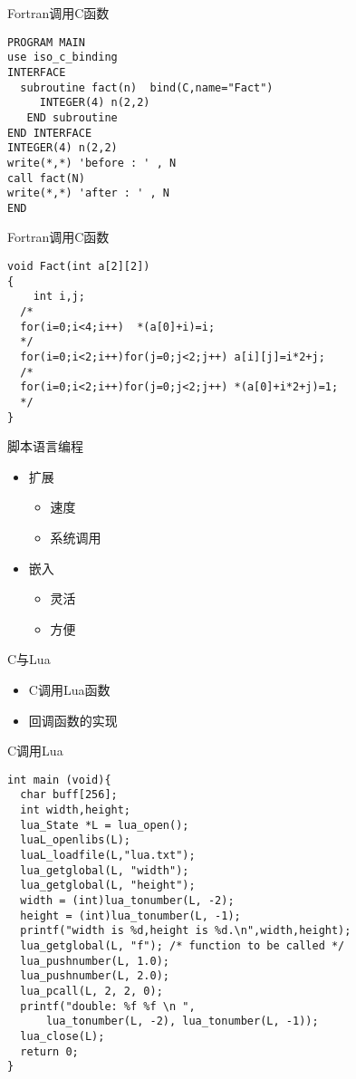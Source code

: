 \def\lstlistingname{例}
\begin{frame}[containsverbatim]{Fortran调用C函数}
\lstset{language=fortran}
\begin{lstlisting}
PROGRAM MAIN
use iso_c_binding
INTERFACE
  subroutine fact(n)  bind(C,name="Fact")
     INTEGER(4) n(2,2)
   END subroutine
END INTERFACE
INTEGER(4) n(2,2)
write(*,*) 'before : ' , N 
call fact(N)
write(*,*) 'after : ' , N 
END
\end{lstlisting}
\end{frame}

\begin{frame}[containsverbatim]{Fortran调用C函数}
\lstset{language=C}
\begin{lstlisting}
void Fact(int a[2][2])
{
 	int i,j;
  /*
  for(i=0;i<4;i++)  *(a[0]+i)=i;
  */
  for(i=0;i<2;i++)for(j=0;j<2;j++) a[i][j]=i*2+j;
  /*
  for(i=0;i<2;i++)for(j=0;j<2;j++) *(a[0]+i*2+j)=1;
  */
}
\end{lstlisting}
\end{frame}


\begin{frame}{脚本语言编程}
\begin{itemize}
\item 扩展
\begin{itemize}
\item 速度
\item 系统调用
\end{itemize}
\item 嵌入
\begin{itemize}
\item 灵活
\item 方便
\end{itemize}
\end{itemize}
\end{frame}

\begin{frame}{C与Lua}
\begin{itemize}
\item C调用Lua函数
\item 回调函数的实现
\end{itemize}
\end{frame}



\begin{frame}[containsverbatim]{C调用Lua}
\begin{lstlisting}
int main (void){
  char buff[256];
  int width,height;
  lua_State *L = lua_open();
  luaL_openlibs(L);
  luaL_loadfile(L,"lua.txt");
  lua_getglobal(L, "width");
  lua_getglobal(L, "height");
  width = (int)lua_tonumber(L, -2);
  height = (int)lua_tonumber(L, -1);
  printf("width is %d,height is %d.\n",width,height);
  lua_getglobal(L, "f"); /* function to be called */
  lua_pushnumber(L, 1.0);
  lua_pushnumber(L, 2.0);
  lua_pcall(L, 2, 2, 0);
  printf("double: %f %f \n ", 
      lua_tonumber(L, -2), lua_tonumber(L, -1)); 
  lua_close(L);
  return 0;
}
\end{lstlisting}
\end{frame}


